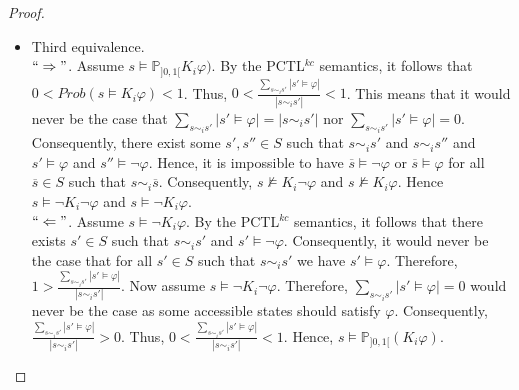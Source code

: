 \begin{proof}
\begin{itemize}
\item Third equivalence. ~\\
    $``\Rightarrow"$. Assume $s\models \mathbb{P}_{]0,1[} K_i\varphi)$. By the PCTL$^{kc}$ semantics, it follows that $0< Prob(s\models K_i\varphi)<1$. Thus, $0<\frac{\sum_{s\sim_i s'}|s'\models \varphi| }{|s \sim_i s'|}<1$.
    This means that it would never be the case that $\sum_{s\sim_i s'}|s'\models \varphi| = |s\sim_i s'|$ nor $\sum_{s\sim_i s'}|s'\models \varphi| = 0$. Consequently, there exist some $s', s'' \in S$ such that $s\sim_i s'$ and $s\sim_i s''$ and $s'\models \varphi$ and $s''\models \neg \varphi$. Hence, it is impossible to have $\overline{s}\models \neg\varphi$ or $\overline{s}\models \varphi$ for all $\overline{s}\in S$ such that $s\sim_i \overline{s}$. Consequently, $s\nvDash  K_i\neg\varphi$ and $s\nvDash K_i\varphi$. Hence $s\models \neg K_i\neg\varphi$ and $s\models \neg K_i\varphi$. ~\\
    $``\Leftarrow"$. Assume $s\models \neg K_i\varphi$. By the PCTL$^{kc}$ semantics, it follows that there exists $s'\in S$ such that $s\sim_i s'$ and $s'\models \neg \varphi$. Consequently, it would never be the case that for all $s'\in S$ such that $s\sim_i s'$ we have $s'\models \varphi$. Therefore, $1>\frac{\sum_{s\sim_i s'}|s'\models \varphi| }{|s\sim_i s'|}$. Now assume $s\models \neg K_i\neg \varphi$. Therefore, $\sum_{s\sim_i s'}|s'\models \varphi| = 0$ would never be the case as some accessible states should satisfy $\varphi$. Consequently, $\frac{\sum_{s\sim_i s'}|s'\models \varphi| }{|s\sim_i s'|}>0$. Thus, $0<\frac{\sum_{s\sim_i s'}|s'\models \varphi| }{|s \sim_i s'|}<1$. Hence, $s\models \mathbb{P}_{]0,1[} (K_i\varphi)$.
\end{itemize}
\end{proof}

